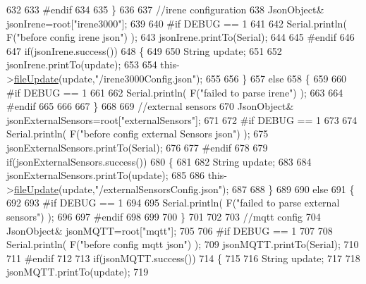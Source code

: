 \begin{DoxyCode}
632     
633 \textcolor{preprocessor}{    #endif}
634 
635     \}
636     
637     \textcolor{comment}{//irene configuration   }
638         JsonObject& jsonIrene=root[\textcolor{stringliteral}{"irene3000"}];
639     
640 \textcolor{preprocessor}{#if DEBUG == 1 }
641 
642     Serial.println( F(\textcolor{stringliteral}{"before config irene json"}) );    
643     jsonIrene.printTo(Serial);
644 
645 \textcolor{preprocessor}{#endif }
646 
647     \textcolor{keywordflow}{if}(jsonIrene.success())
648     \{
649 
650         String update;
651     
652         jsonIrene.printTo(update);
653 
654         this->\hyperlink{class_cool_file_system_a13f2958f5b87757c31fc53797a30d23a}{fileUpdate}(update,\textcolor{stringliteral}{"/irene3000Config.json"});     
655     
656     \}
657     \textcolor{keywordflow}{else}
658     \{
659     
660 \textcolor{preprocessor}{    #if DEBUG == 1 }
661 
662         Serial.println( F(\textcolor{stringliteral}{"failed to parse irene"}) );   
663     
664 \textcolor{preprocessor}{    #endif }
665 
666 
667     \}
668     
669     \textcolor{comment}{//external sensors}
670         JsonObject& jsonExternalSensors=root[\textcolor{stringliteral}{"externalSensors"}];
671 
672 \textcolor{preprocessor}{#if DEBUG == 1 }
673 
674     Serial.println( F(\textcolor{stringliteral}{"before config external Sensors json"}) );
675     jsonExternalSensors.printTo(Serial);
676 
677 \textcolor{preprocessor}{#endif}
678 
679     \textcolor{keywordflow}{if}(jsonExternalSensors.success())
680     \{
681 
682         String update;
683     
684         jsonExternalSensors.printTo(update);
685 
686         this->\hyperlink{class_cool_file_system_a13f2958f5b87757c31fc53797a30d23a}{fileUpdate}(update,\textcolor{stringliteral}{"/externalSensorsConfig.json"});       
687 
688     \}
689 
690     \textcolor{keywordflow}{else}
691     \{   
692 
693 \textcolor{preprocessor}{    #if DEBUG == 1}
694         
695         Serial.println( F(\textcolor{stringliteral}{"failed to parse external sensors"}) );
696 
697 \textcolor{preprocessor}{    #endif}
698 
699 
700     \}
701 
702     
703     \textcolor{comment}{//mqtt config}
704         JsonObject& jsonMQTT=root[\textcolor{stringliteral}{"mqtt"}];
705     
706 \textcolor{preprocessor}{#if DEBUG == 1 }
707 
708     Serial.println( F(\textcolor{stringliteral}{"before config mqtt json"}) );
709     jsonMQTT.printTo(Serial);
710 
711 \textcolor{preprocessor}{#endif}
712 
713     \textcolor{keywordflow}{if}(jsonMQTT.success())
714     \{
715 
716         String update;
717     
718         jsonMQTT.printTo(update);
719 

\end{DoxyCode}
